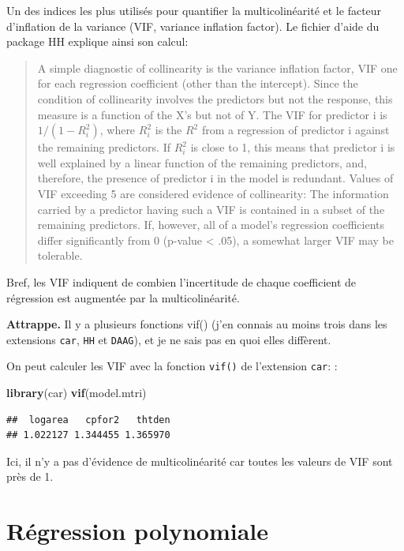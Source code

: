 \documentclass[
  12pt,
]{book}
\newenvironment{Shaded}{\begin{snugshade}}{\end{snugshade}}
\newcommand{\KeywordTok}[1]{\textcolor[rgb]{0.13,0.29,0.53}{\textbf{#1}}}
\newcommand{\NormalTok}[1]{#1}
\begin{document}
Un des indices les plus utilisés pour quantifier la multicolinéarité et le facteur d'inflation de la variance (VIF, variance inflation factor). Le fichier d'aide du package HH explique ainsi son calcul:

\begin{quote}
A simple diagnostic of collinearity is the variance inflation factor, VIF one for each regression coefficient (other than the intercept). Since the condition of collinearity involves the predictors but not the response, this measure is a function of the X's but not of Y. The VIF for predictor i is \(1/(1-R_i^2)\), where \(R_i^2\) is the \(R^2\) from a regression of predictor i against the remaining predictors. If \(R_i^2\) is close to 1, this means that predictor i is well explained by a linear function of the remaining predictors, and, therefore, the presence of predictor i in the model is redundant. Values of VIF exceeding 5 are considered evidence of collinearity: The information carried by a predictor having such a VIF is contained in a subset of the remaining predictors. If, however, all of a model's regression coefficients differ significantly from 0 (p-value \textless{} .05), a somewhat larger VIF may be tolerable.
\end{quote}

Bref, les VIF indiquent de combien l'incertitude de chaque coefficient de régression est augmentée par la multicolinéarité.

\textbf{Attrappe.} Il y a plusieurs fonctions vif() (j'en connais au moins trois dans les extensions \texttt{car}, \texttt{HH} et \texttt{DAAG}), et je ne sais pas en quoi elles diffèrent.

On peut calculer les VIF avec la fonction \texttt{vif()} de l'extension \texttt{car}: :

\begin{Shaded}
\begin{Highlighting}[]
\KeywordTok{library}\NormalTok{(car)}
\KeywordTok{vif}\NormalTok{(model.mtri)}
\end{Highlighting}
\end{Shaded}

\begin{verbatim}
##  logarea   cpfor2   thtden 
## 1.022127 1.344455 1.365970
\end{verbatim}

Ici, il n'y a pas d'évidence de multicolinéarité car toutes les valeurs de VIF sont près de 1.

\hypertarget{ruxe9gression-polynomiale}{%
\section{Régression polynomiale}\label{ruxe9gression-polynomiale}}
\end{document}
